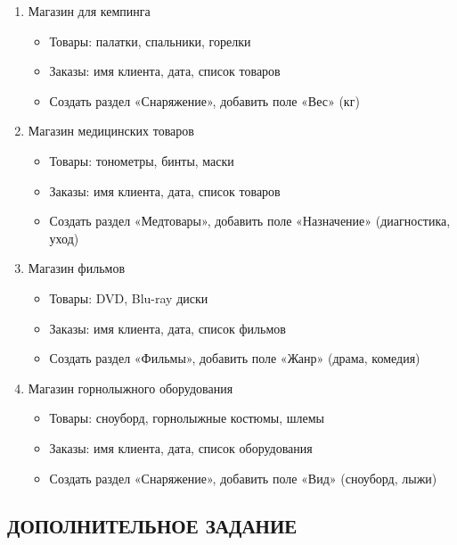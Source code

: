 \documentclass[12pt]{article}
\begin{document}
\begin{enumerate}
	\item Магазин для кемпинга
	      \begin{itemize}
		      \item Товары: палатки, спальники, горелки
		      \item Заказы: имя клиента, дата, список товаров
		      \item Создать раздел «Снаряжение», добавить поле «Вес» (кг)
	      \end{itemize}

	\item Магазин медицинских товаров
	      \begin{itemize}
		      \item Товары: тонометры, бинты, маски
		      \item Заказы: имя клиента, дата, список товаров
		      \item Создать раздел «Медтовары», добавить поле «Назначение» (диагностика, уход)
	      \end{itemize}

	      \newpage

	\item Магазин фильмов
	      \begin{itemize}
		      \item Товары: DVD, Blu-ray диски
		      \item Заказы: имя клиента, дата, список фильмов
		      \item Создать раздел «Фильмы», добавить поле «Жанр» (драма, комедия)
	      \end{itemize}

	\item Магазин горнолыжного оборудования
	      \begin{itemize}
		      \item Товары: сноуборд, горнолыжные костюмы, шлемы
		      \item Заказы: имя клиента, дата, список оборудования
		      \item Создать раздел «Снаряжение», добавить поле «Вид» (сноуборд, лыжи)
	      \end{itemize}

\end{enumerate}

\subsection
[ДОПОЛНИТЕЛЬНОЕ ЗАДАНИЕ~\texorpdfstring{\faLightbulb}{}]
{ДОПОЛНИТЕЛЬНОЕ ЗАДАНИЕ~\texorpdfstring{\faLightbulb}{}\protect\footnotemark}
\end{document}
